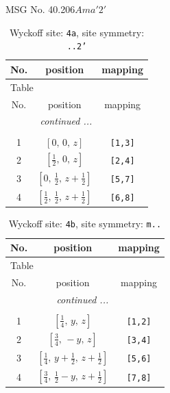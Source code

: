 \documentclass[fleqn,8pt]{jsarticle}
\begin{document}
\setcounter{MaxMatrixCols}{32}

\renewcommand{\tablename}{Table~}
\renewcommand{\figurename}{Figure~}
\begin{center}
\LARGE
MSG No. 40.206\quad$Ama'2'$
\end{center}
\renewcommand{\arraystretch}{1.2}
\begin{longtable}{ccc}
\caption{Wyckoff site: {\tt 4a}, site symmetry: {\tt ..2'}}
 \\
 \hline \hline
No. & position & mapping \\ \hline \endfirsthead

\multicolumn{2}{l}{\tablename\ \thetable{}} \\
 \hline \hline
No. & position & mapping \\ \hline \endhead

 \hline \hline
\multicolumn{2}{r}{\footnotesize\it continued ...} \\ \endfoot

 \hline \hline
\multicolumn{2}{r}{} \\ \endlastfoot

1 & $\left[ 0,\, 0,\, z \right]$ & {\tt [1,3]} \\ \hline
2 & $\left[ \frac{1}{2},\, 0,\, z \right]$ & {\tt [2,4]} \\ \hline
3 & $\left[ 0,\, \frac{1}{2},\, z + \frac{1}{2} \right]$ & {\tt [5,7]} \\ \hline
4 & $\left[ \frac{1}{2},\, \frac{1}{2},\, z + \frac{1}{2} \right]$ & {\tt [6,8]} \\
\end{longtable}
\renewcommand{\arraystretch}{1.2}
\begin{longtable}{ccc}
\caption{Wyckoff site: {\tt 4b}, site symmetry: {\tt m..}}
 \\
 \hline \hline
No. & position & mapping \\ \hline \endfirsthead

\multicolumn{2}{l}{\tablename\ \thetable{}} \\
 \hline \hline
No. & position & mapping \\ \hline \endhead

 \hline \hline
\multicolumn{2}{r}{\footnotesize\it continued ...} \\ \endfoot

 \hline \hline
\multicolumn{2}{r}{} \\ \endlastfoot

1 & $\left[ \frac{1}{4},\, y,\, z \right]$ & {\tt [1,2]} \\ \hline
2 & $\left[ \frac{3}{4},\, - y,\, z \right]$ & {\tt [3,4]} \\ \hline
3 & $\left[ \frac{1}{4},\, y + \frac{1}{2},\, z + \frac{1}{2} \right]$ & {\tt [5,6]} \\ \hline
4 & $\left[ \frac{3}{4},\, \frac{1}{2} - y,\, z + \frac{1}{2} \right]$ & {\tt [7,8]} \\
\end{longtable}
\end{document}
